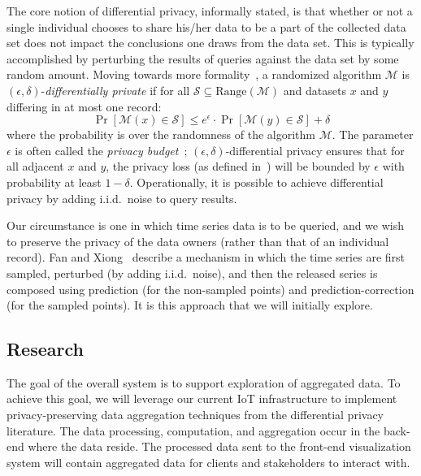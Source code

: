 The core notion of differential privacy, informally stated, is that whether
or not a single individual chooses to share his/her data to be a part of
the collected data set does not impact the conclusions one draws from
the data set.
This is typically accomplished by perturbing the results of queries
against the data set by some random amount.
Moving towards more formality~\cite{dr14}, a randomized algorithm $\mathcal{M}$
is $(\epsilon,\delta)$-\emph{differentially private} if for all
$\mathcal{S} \subseteq \mbox{Range}(\mathcal{M})$ and datasets $x$ and $y$
differing in at most one record:
\begin{equation}
\Pr[\mathcal{M}(x) \in \mathcal{S}] \leq e^\epsilon \cdot \Pr[\mathcal{M}(y)
\in \mathcal{S}] + \delta
\label{eqn:dp}
\end{equation}
where the probability is over the randomness of the algorithm $\mathcal{M}$.
The parameter $\epsilon$ is often called the
\emph{privacy budget}~\cite{McSherry09}; $(\epsilon,\delta)$-differential
privacy ensures that for all adjacent $x$ and $y$, the privacy loss
(as defined in~\cite{dr14}) will
be bounded by $\epsilon$ with probability at least $1-\delta$.
Operationally, it is possible to achieve differential privacy by adding
i.i.d.~noise to query results.

Our circumstance is one in which time series data is to be queried, and we
wish to preserve the privacy of the data owners (rather than that of
an individual record).
Fan and Xiong~\cite{fx12,fx14} describe a mechanism in which the time
series are first sampled, perturbed (by adding i.i.d.~noise), and then
the released series is composed using prediction (for the non-sampled
points) and prediction-correction (for the sampled points).  It is this
approach that we will initially explore.

\subsection{Research}

The goal of the overall system is to support exploration of aggregated data. 
To achieve this goal, we will leverage our current IoT infrastructure
to implement privacy-preserving data aggregation techniques from the
differential privacy literature.
The data processing, computation, and aggregation occur in the
back-end where the data reside.
The processed data sent to the front-end visualization system will
contain aggregated data for clients and stakeholders to interact with.

